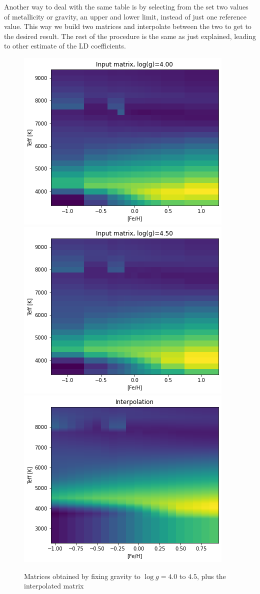 \documentclass[a4paper,11pt,twocolumn]{article}
\begin{document}
Another way to deal with the same table is by selecting from the set two values
of metallicity or gravity, an upper and lower limit, instead of just one reference 
value. This way we build two matrices and 
interpolate between the two to get to the desired result. The rest of the procedure is 
the same as just explained, leading to other estimate of the LD coefficients.
\begin{figure}[H]
    \centering  
    \includegraphics[scale=0.35, angle=0]{../pictures/Claret2017/double_logg4}
    \includegraphics[scale=0.35, angle=0]{../pictures/Claret2017/double_logg45}
    \includegraphics[scale=0.35, angle=0]{../pictures/Claret2017/double_logg_interp}
    \caption{Matrices obtained by fixing gravity to $\log{g}=4.0$ to $4.5$, plus the interpolated matrix}
\end{figure}
\end{document}
